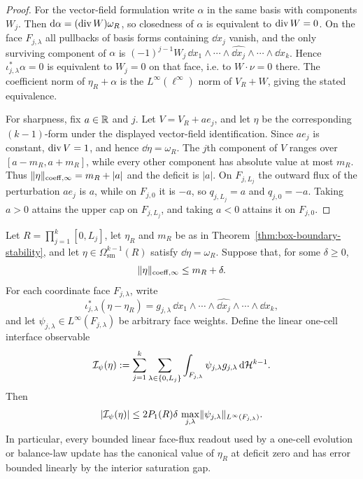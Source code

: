 \begin{proof}
For the vector-field formulation write $\alpha$ in the same basis with
components $W_j$. Then $\mathrm{d}\alpha=(\operatorname{div} W)\omega_R$, so closedness of $\alpha$
is equivalent to $\operatorname{div} W=0$. On the face $F_{j,\lambda}$ all pullbacks of basis
forms containing $\dd x_j$ vanish, and the only surviving component of
$\alpha$ is $(-1)^{j-1}W_j\,\dd x_1\wedge\cdots\wedge\widehat{\dd x_j}
\wedge\cdots\wedge\dd x_k$. Hence
$\iota_{j,\lambda}^\ast\alpha=0$ is equivalent to $W_j=0$ on that face, i.e.
to $W\cdot\nu=0$ there. The coefficient norm of $\eta_R+\alpha$ is the
$L^\infty(\ell^\infty)$ norm of $V_R+W$, giving the stated equivalence.

For sharpness, fix $a\in\mathbb{R}$ and $j$. Let $V=V_R+a e_j$, and let $\eta$ be the
corresponding $(k-1)$-form under the displayed vector-field identification.
Since $a e_j$ is constant, $\operatorname{div} V=1$, and hence $\dd\eta=\omega_R$. The $j$th
component of $V$ ranges over $[a-m_R,a+m_R]$, while every other component has
absolute value at most $m_R$. Thus
$\lVert \eta \rVert_{\mathrm{coeff},\infty}=m_R+|a|$ and the deficit is $|a|$. On
$F_{j,L_j}$ the outward flux of the perturbation $a e_j$ is $a$, while on
$F_{j,0}$ it is $-a$, so $q_{j,L_j}=a$ and $q_{j,0}=-a$. Taking $a>0$ attains
the upper cap on $F_{j,L_j}$, and taking $a<0$ attains it on $F_{j,0}$.
\end{proof}

\begin{corollary}
\label{cor:local-cell-interface-stability}
Let $R=\prod_{j=1}^k[0,L_j]$, let $\eta_R$ and $m_R$ be as in
Theorem~\ref{thm:box-boundary-stability}, and let
$\eta\in\Omega^{k-1}_{\mathrm{sm}}(R)$ satisfy $\dd\eta=\omega_R$. Suppose that,
for some $\delta\ge0$,
\[
\lVert \eta \rVert_{\mathrm{coeff},\infty}\le m_R+\delta .
\]
For each coordinate face $F_{j,\lambda}$, write
\[
\iota_{j,\lambda}^\ast(\eta-\eta_R)
=g_{j,\lambda}\,
\dd x_1\wedge\cdots\wedge\widehat{\dd x_j}\wedge\cdots\wedge\dd x_k,
\]
and let $\psi_{j,\lambda}\in L^\infty(F_{j,\lambda})$ be arbitrary face weights.
Define the linear one-cell interface observable
\[
\mathcal I_\psi(\eta):=
\sum_{j=1}^k\sum_{\lambda\in\{0,L_j\}}
\int_{F_{j,\lambda}}\psi_{j,\lambda}g_{j,\lambda}
\,\mathrm{d}\mathcal{H}^{k-1} .
\]
Then
\begin{equation}
\label{eq:local-cell-interface-stability}
\lvert \mathcal I_\psi(\eta) \rvert
\le
2P_1(R)\delta\,
\max_{j,\lambda}\lVert \psi_{j,\lambda} \rVert_{L^\infty(F_{j,\lambda})} .
\end{equation}
In particular, every bounded linear face-flux readout used by a one-cell
evolution or balance-law update has the canonical value of $\eta_R$ at
deficit zero and has error bounded linearly by the interior saturation gap.
\end{corollary}

